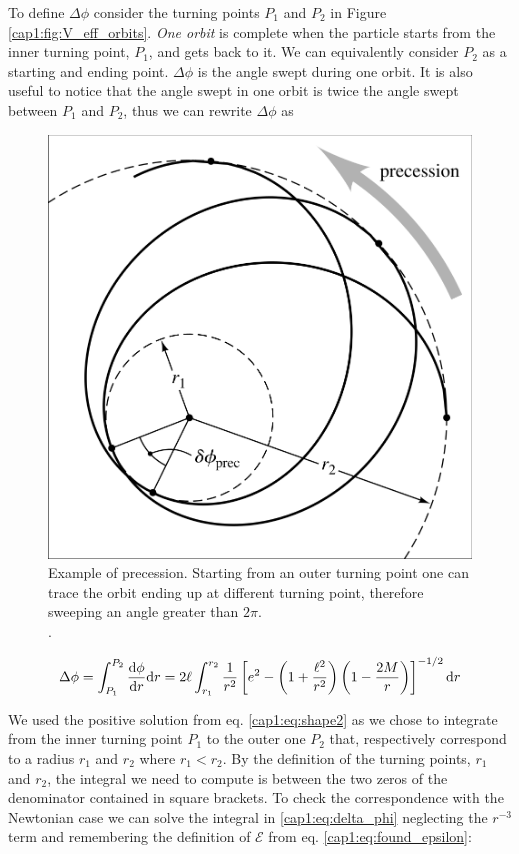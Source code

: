 To define $\Delta \phi$ consider the turning points $P_1$ and $P_2$ in Figure
\ref{cap1:fig:V_eff_orbits}.
\textit{One orbit} is complete when the particle starts from the inner turning
point, $P_1$, and gets back to it.
We can equivalently consider $P_2$ as a starting and ending point.
$\Delta \phi$ is the angle swept during one orbit.
It is also useful to notice that the angle swept in one orbit is twice the angle
swept between $P_1$ and $P_2$, thus we can rewrite $\Delta \phi$ as

\begin{figure}[h]
    \centering
    \includegraphics[width = 0.5 \textwidth]{Figures/chapter1/precession_bozza.png}
    \caption{Example of precession.
    Starting from an outer turning point one can trace the orbit ending up at
    different turning point, therefore sweeping an angle greater than $2 \pi$.
    \\ .}
    \label{cap1:fig:precession}
\end{figure}

\begin{equation}
    \Delta \phi = \int_{P_1}^{P_2} \dv{\phi}{r} \mathrm{d}r
    = 2 \ell \int_{r_1}^{r_2} \frac{1}{r^2}
    \left[e^2 - \left(1 + \frac{\ell^2}{r^2}\right)
    \left(1 - \frac{2M}{r}\right)\right]^{-1/2} \mathrm{d}r
    \label{cap1:eq:delta_phi}
\end{equation}

We used the positive solution from eq. \ref{cap1:eq:shape2} as we chose to
integrate from the inner turning point $P_1$ to the outer one $P_2$ that,
respectively correspond to a radius $r_1$ and $r_2$ where $r_1 < r_2$.
By the definition of the turning points, $r_1$ and $r_2$, the integral we need
to compute is between the two zeros of the denominator contained in square
brackets.
To check the correspondence with the Newtonian case we can solve the integral
in \ref{cap1:eq:delta_phi} neglecting the $r^{-3}$ term and remembering the
definition of $\mathcal E$ from eq. \ref{cap1:eq:found_epsilon}:

